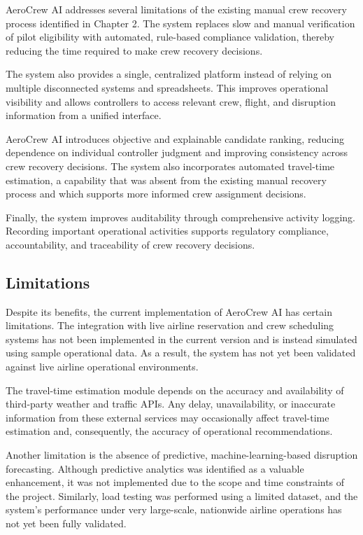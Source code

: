 \documentclass[12pt,a4paper]{report}
\begin{document}
AeroCrew AI addresses several limitations of the existing manual crew recovery process identified in Chapter 2. The system replaces slow and manual verification of pilot eligibility with automated, rule-based compliance validation, thereby reducing the time required to make crew recovery decisions.

The system also provides a single, centralized platform instead of relying on multiple disconnected systems and spreadsheets. This improves operational visibility and allows controllers to access relevant crew, flight, and disruption information from a unified interface.

AeroCrew AI introduces objective and explainable candidate ranking, reducing dependence on individual controller judgment and improving consistency across crew recovery decisions. The system also incorporates automated travel-time estimation, a capability that was absent from the existing manual recovery process and which supports more informed crew assignment decisions.

Finally, the system improves auditability through comprehensive activity logging. Recording important operational activities supports regulatory compliance, accountability, and traceability of crew recovery decisions.

\subsection{Limitations}

Despite its benefits, the current implementation of AeroCrew AI has certain limitations. The integration with live airline reservation and crew scheduling systems has not been implemented in the current version and is instead simulated using sample operational data. As a result, the system has not yet been validated against live airline operational environments.

The travel-time estimation module depends on the accuracy and availability of third-party weather and traffic APIs. Any delay, unavailability, or inaccurate information from these external services may occasionally affect travel-time estimation and, consequently, the accuracy of operational recommendations.

Another limitation is the absence of predictive, machine-learning-based disruption forecasting. Although predictive analytics was identified as a valuable enhancement, it was not implemented due to the scope and time constraints of the project. Similarly, load testing was performed using a limited dataset, and the system's performance under very large-scale, nationwide airline operations has not yet been fully validated.
\end{document}
